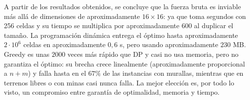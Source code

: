 A partir de los resultados obtenidos, se concluye que la 
fuerza bruta es inviable más allá de dimensiones de 
aproximadamente $16 \times 16$: 
ya que toma segundos con 256 celdas y su tiempo se multiplica 
por aproximadamente $600$ al duplicar el tamaño. 
La programación dinámica entrega el óptimo hasta aproximadamente$2 \cdot 10^{6}$ 
celdas en aproximadamente $0{,}6$ s, pero usando aproximadamente $230$ MB. 
Greedy es unas $2000$ veces más rápido que DP y casi no usa memoria, pero no 
garantiza el óptimo: su brecha crece linealmente (aproximadamente proporcional a $n+m$)
y falla hasta en el $67\%$ de las instancias con murallas, 
mientras que en 
terrenos libres o con minas casi nunca falla. La mejor elección es, 
por todo lo visto, un compromiso entre garantía de optimalidad, 
memoria y tiempo.